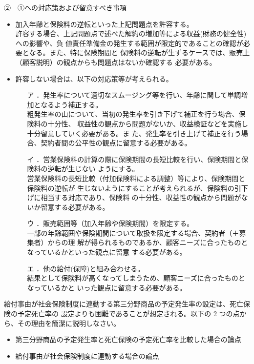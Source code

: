 \documentclass[report,gutter=10mm,fore-edge=10mm,uplatex,dvipdfmx]{jlreq}
\begin{document}
②　①への対応策および留意すべき事項
\begin{itemize}
 \item 加入年齢と保険料の逆転といった上記問題点を許容する。\\
許容する場合、上記問題点で述べた解約の増加等による収益(財務の健全性)への影響や、負
値責任準備金の発生する範囲が限定的であることの確認が必要となる。また、特に保険期間と
保険料の逆転が生ずるケースでは、販売上（顧客説明）の観点からも問題点はないか確認する
必要がある。
 \item 許容しない場合は、以下の対応策等が考えられる。
\begin{itemize}
 \item [ア]．発生率について適切なスムージング等を行い、年齢に関して単調増加となるよう補正する。\\
粗発生率の山について、当初の発生率を引き下げて補正を行う場合、保険料の十分性、
収益性の観点から問題がないか、収益検証などを実施し十分留意していく必要がある。ま
た、発生率を引き上げて補正を行う場合、契約者間の公平性の観点に留意する必要がある。
 \item [イ]．営業保険料の計算の際に保険期間の長短比較を行い、保険期間と保険料の逆転が生じない
ようにする。\\
営業保険料の長短比較（付加保険料による調整）等により、保険期間と保険料の逆転が
生じないようにすることが考えられるが、保険料の引下げに相当する対応であり、保険料
の十分性、収益性の観点から問題がないか留意する必要がある。
 \item [ウ]．販売範囲等（加入年齢や保険期間）を限定する。\\
一部の年齢範囲や保険期間について取扱を限定する場合、契約者（＋募集者）からの理
解が得られるものであるか、顧客ニーズに合ったものとなっているかといった観点に留意
する必要がある。
 \item [エ]．他の給付(保障)と組み合わせる。\\
結果として保険料が高くなってしまうため、顧客ニーズに合ったものとなっているかと
いった観点に留意する必要がある。
\end{itemize}
\end{itemize}
給付事由が社会保険制度に連動する第三分野商品の予定発生率の設定は、死亡保険の予定死亡率の
設定よりも困難であることが想定される。以下の 2 つの点から、その理由を簡潔に説明しなさい。
\begin{itemize}
 \item 第三分野商品の予定発生率と死亡保険の予定死亡率を比較した場合の論点
 \item 給付事由が社会保険制度に連動する場合の論点
\end{itemize}
\end{document}
